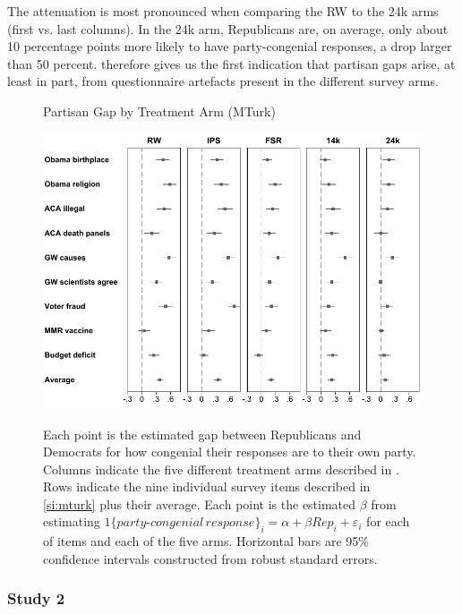 \documentclass[12pt, letterpaper]{article}
\begin{document}
The attenuation is most pronounced when comparing the RW to the 24k arms (first vs. last columns). In the 24k arm, Republicans are, on average, only about 10 percentage points more likely to have party-congenial responses, a drop larger than 50 percent.  therefore gives us the first indication that partisan gaps arise, at least in part, from questionnaire artefacts present in the different survey arms.

\begin{center}
	\begin{figure}[t]
		\centering
		\caption{Partisan Gap by Treatment Arm (MTurk)}
		\includegraphics[width=\textwidth]{../figs/partisan-gap-by-item-arm.pdf}
		\label{fig:partisangaps-mturk}
		\caption*{\footnotesize 
			Each point is the estimated gap between Republicans and Democrats for how congenial their responses are to their own party.
			Columns indicate the five different treatment arms described in . Rows indicate the nine individual survey items described in \cref{si:mturk} plus their average.
			Each point is the estimated $\beta$ from estimating $1\{party\text{-}congenial\, response\}_i = \alpha + \beta Rep_i + \varepsilon_i$ for each of items and each of the five arms.			
			Horizontal bars are 95\% confidence intervals constructed from robust standard errors.
		}
	\end{figure}
\end{center}

\subsubsection*{Study 2}
\end{document}
